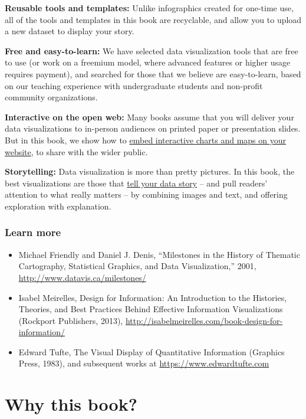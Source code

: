 \documentclass[
  english,
]{book}
\providecommand{\tightlist}{%
  \setlength{\itemsep}{0pt}\setlength{\parskip}{0pt}}
\begin{document}
\textbf{Reusable tools and templates:} Unlike infographics created for one-time use, all of the tools and templates in this book are recyclable, and allow you to upload a new dataset to display your story.

\textbf{Free and easy-to-learn:} We have selected data visualization tools that are free to use (or work on a freemium model, where advanced features or higher usage requires payment), and searched for those that we believe are easy-to-learn, based on our teaching experience with undergraduate students and non-profit community organizations.

\textbf{Interactive on the open web:} Many books assume that you will deliver your data visualizations to in-person audiences on printed paper or presentation slides. But in this book, we show how to \href{embed}{embed interactive charts and maps on your website}, to share with the wider public.

\textbf{Storytelling:} Data visualization is more than pretty pictures. In this book, the best visualizations are those that \href{story}{tell your data story} -- and pull readers' attention to what really matters -- by combining images and text, and offering exploration with explanation.

\hypertarget{learn-more}{%
\subsubsection*{Learn more}\label{learn-more}}

\begin{itemize}
\tightlist
\item
  Michael Friendly and Daniel J. Denis, ``Milestones in the History of Thematic Cartography, Statistical Graphics, and Data Visualization,'' 2001, \url{http://www.datavis.ca/milestones/}
\item
  Isabel Meirelles, Design for Information: An Introduction to the Histories, Theories, and Best Practices Behind Effective Information Visualizations (Rockport Publishers, 2013), \url{http://isabelmeirelles.com/book-design-for-information/}
\item
  Edward Tufte, The Visual Display of Quantitative Information (Graphics Press, 1983), and subsequent works at \url{https://www.edwardtufte.com}
\end{itemize}

\hypertarget{why}{%
\section{Why this book?}\label{why}}
\end{document}
